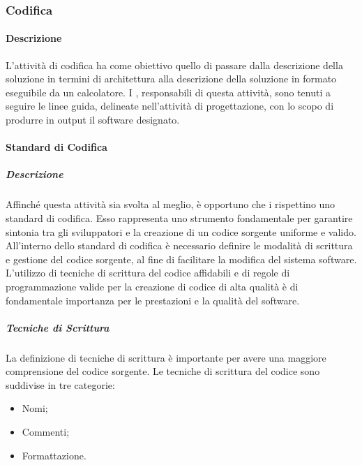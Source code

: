 \subsubsection{Codifica}

\paragraph{Descrizione}
L'attività di codifica ha come obiettivo quello di passare dalla descrizione della soluzione in termini di architettura alla descrizione della soluzione in formato eseguibile da un calcolatore. I \textit{\Progrs}, responsabili di questa attività, sono tenuti a seguire le linee guida, delineate nell'attività di progettazione, con lo scopo di produrre in output il software designato.

\paragraph{Standard di Codifica}
\subparagraph{Descrizione}
Affinché questa attività sia svolta al meglio, è opportuno che i \textit{\Progrs} rispettino uno standard di codifica.
Esso rappresenta uno strumento fondamentale per garantire sintonia tra gli sviluppatori e la creazione di un codice sorgente uniforme e valido.
All'interno dello standard di codifica è necessario definire le modalità di scrittura e gestione del codice sorgente, al fine di facilitare la modifica del sistema software.
L'utilizzo di tecniche di scrittura del codice affidabili e di regole di programmazione valide per la creazione di codice di alta qualità è di fondamentale importanza per le prestazioni e la qualità del software.


\subparagraph{Tecniche di Scrittura}
La definizione di tecniche di scrittura è importante per avere una maggiore comprensione del codice sorgente.
Le tecniche di scrittura del codice sono suddivise in tre categorie:
\begin{itemize}
\item
Nomi;
\item
Commenti;
\item
Formattazione.
\end{itemize}

